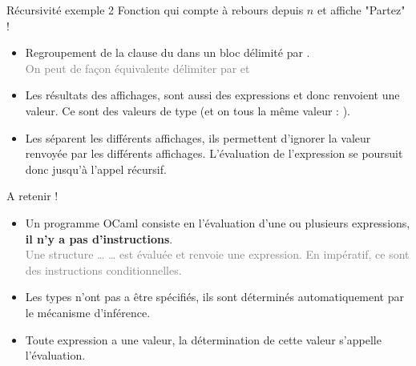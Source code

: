 \documentclass[10pt]{beamer}
\begin{document}
\begin{frame}{\Ctitle}{\stitle}
	\begin{exampleblock}{Récursivité exemple 2}
		Fonction qui compte à rebours depuis $n$ et affiche "Partez" !
		\begin{itemize}
			\item<2-> Regroupement de la clause du  dans un bloc délimité par \kw{(} \kw{)}. \\
				\textcolor{gray}{On peut de façon équivalente délimiter par  et }
			\item<3-> Les résultats des affichages, sont aussi des expressions et donc renvoient une valeur. Ce sont des valeurs  de type  (et on tous la même valeur : \kw{()}).
			\item<4-> Les \kw{;} séparent les différents affichages, ils permettent d'ignorer la valeur renvoyée par les différents affichages. L'évaluation de l'expression se poursuit donc jusqu'à l'appel récursif.
		\end{itemize}
	\end{exampleblock}
\end{frame}

\begin{frame}{\Ctitle}{\stitle}
	\begin{block}{\textcolor{yellow}{\danger} A retenir !}
		\begin{itemize}
			\item<1-> Un programme OCaml consiste en l'évaluation d'une ou plusieurs expressions, \textbf{il n'y a pas d'instructions}.\\
				\onslide<2->\textcolor{gray}{Une structure  \dots {} \dots {} est évaluée et renvoie une expression. En impératif, ce sont des instructions conditionnelles.}
			\item<3-> Les types n'ont pas a être spécifiés, ils sont déterminés automatiquement par le mécanisme d'inférence.
			\item<4-> Toute expression a une valeur, la détermination de cette valeur s'appelle l'évaluation.
		\end{itemize}
	\end{block}
\end{frame}
\end{document}
